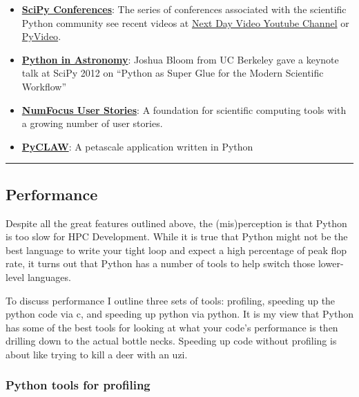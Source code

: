 \documentclass{article}
\begin{document}
\begin{itemize}
\itemsep1pt\parskip0pt
\item
  \textbf{\href{http://conference.scipy.org/}{SciPy Conferences}}: The
  series of conferences associated with the scientific Python community
  see recent videos at
  \href{http://www.youtube.com/user/NextDayVideo/videos?flow=grid\&view=0}{Next
  Day Video Youtube Channel} or \href{http://pyvideo.org}{PyVideo}.
\item
  \textbf{\href{http://www.youtube.com/watch?v=mLuIB8aW2KA\&feature=youtu.be}{Python
  in Astronomy}}: Joshua Bloom from UC Berkeley gave a keynote talk at
  SciPy 2012 on ``Python as Super Glue for the Modern Scientific
  Workflow''
\item
  \textbf{\href{http://numfocus.org/user-stories/}{NumFocus User
  Stories}}: A foundation for scientific computing tools with a growing
  number of user stories.
\item
  \textbf{\href{http://numerics.kaust.edu.sa/papers/pyclaw-sisc/pyclaw-sisc.html}{PyCLAW}}:
  A petascale application written in Python
\end{itemize}

    \begin{center}\rule{3in}{0.4pt}\end{center}

\subsection{Performance}\label{performance}

Despite all the great features outlined above, the (mis)perception is
that Python is too slow for HPC Development. While it is true that
Python might not be the best language to write your tight loop and
expect a high percentage of peak flop rate, it turns out that Python has
a number of tools to help switch those lower-level languages.

To discuss performance I outline three sets of tools: profiling,
speeding up the python code via c, and speeding up python via python. It
is my view that Python has some of the best tools for looking at what
your code's performance is then drilling down to the actual bottle
necks. Speeding up code without profiling is about like trying to kill a
deer with an uzi.

\subsubsection{Python tools for
profiling}\label{python-tools-for-profiling}
\end{document}
